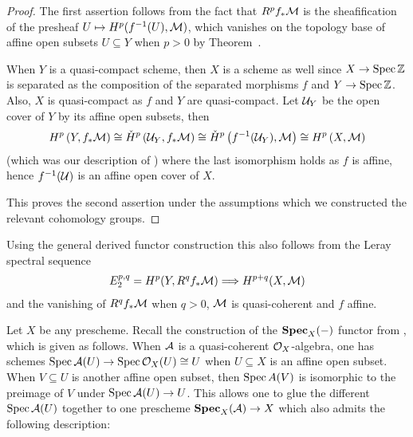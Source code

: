 \documentclass[a4paper,parskip=half,numbers=enddot, DIV=12]{scrreprt}
\begin{document}
\begin{proof}
	The first assertion follows from the fact that $R^pf_*\mathcal{M}$ is the sheafification of the presheaf $U\mapsto H^p(f^{-1}(U),\mathcal{M})$, which vanishes on the topology base of affine open subsets $U\subseteq Y$ when $p>0$ by Theorem~.
	
	When $Y$ is a quasi-compact scheme, then $X$ is a scheme as well since $X\morphism\Spec \IZ$ is separated as the composition of the separated morphisms $f$ and $Y\morphism\Spec \IZ$. Also, $X$ is quasi-compact as $f$ and $Y$ are quasi-compact. Let $\mathcal{U}_Y$ be the open cover of $Y$ by its affine open subsets, then
	\begin{align*}
		H^p\left(Y,f_*\mathcal{M}\right)\cong \check{H}^p\left(\mathcal{U}_Y,f_*\mathcal{M}\right)\cong \check{H}^p\left(f^{-1}(\mathcal{U}_Y),\mathcal{M}\right)\cong H^p\left(X,\mathcal{M}\right)
	\end{align*}
	(which was our description of ) where the last isomorphism holds as $f$ is affine, hence $f^{-1}(\mathcal{U})$ is an affine open cover of $X$.
	
	This proves the second assertion under the assumptions which we constructed the relevant cohomology groups.
\end{proof}
\begin{rem*}
	Using the general derived functor construction this also follows from the Leray spectral sequence
	\begin{align*}
		E_2^{p,q}=H^p(Y,R^qf_*\Mm)\converge H^{p+q}(X,\Mm)
	\end{align*}
	and the vanishing of $R^qf_*\mathcal{M}$ when $q>0$, $\mathcal{M}$ is quasi-coherent and $f$ affine.
\end{rem*}
Let $X$ be any prescheme. Recall the construction of the $\operatorname{\mathbf{Spec}}_X(-)$ functor from \cite[Subsection~2.5.1]{alggeo1}, which is given as follows. When $\mathcal{A}$ is a quasi-coherent $\mathcal{O}_X$-algebra, one has schemes $\Spec \Aa(U)\morphism \Spec \Oo_X(U)\cong U$ when $U\subseteq X$ is an affine open subset. When $V\subseteq U$ is another affine open subset, then $\operatorname{Spec} A(V)$ is isomorphic to the preimage of $V$ under $\Spec \Aa(U)\morphism U$. This allows one to glue the different $\operatorname{Spec} \mathcal{A}(U)$ together to one prescheme $\SPEC_X(\Aa)\morphism X$ which also admits the following description:
\end{document}
